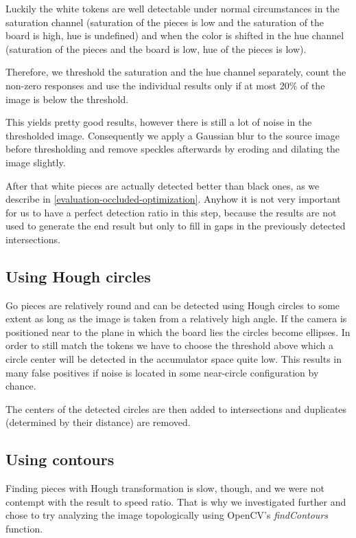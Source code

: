 	Luckily the white tokens are well detectable under normal circumstances in the saturation channel (saturation of the pieces is low and the saturation of the board is high, hue is undefined) and when the color is shifted in the hue channel (saturation of the pieces and the board is low, hue of the pieces is low).

	Therefore, we threshold the saturation and the hue channel separately, count the non-zero responses and use the individual results only if at most 20\% of the image is below the threshold.

	This yields pretty good results, however there is still a lot of noise in the thresholded image. Consequently we apply a Gaussian blur to the source image before thresholding and remove speckles afterwards by eroding and dilating the image slightly.

	After that white pieces are actually detected better than black ones, as we describe in \autoref{evaluation-occluded-optimization}. Anyhow it is not very important for us to have a perfect detection ratio in this step, because the results are not used to generate the end result but only to fill in gaps in the previously detected intersections.

	\subsection{Using Hough circles}
	\label{detector-occluded-hough}
	Go pieces are relatively round and can be detected using Hough circles to some extent as long as the image is taken from a relatively high angle. If the camera is positioned near to the plane in which the board lies the circles become ellipses. In order to still match the tokens we have to choose the threshold above which a circle center will be detected in the accumulator space quite low. This results in many false positives if noise is located in some near-circle configuration by chance.

	The centers of the detected circles are then added to intersections and duplicates (determined by their distance) are removed.

	\subsection{Using contours}
	\label{detector-occluded-contours}
	Finding pieces with Hough transformation is slow, though, and we were not contempt with the result to speed ratio. That is why we investigated further and chose to try analyzing the image topologically \cite{suzuki1985topological} using OpenCV's \emph{findContours} function.


